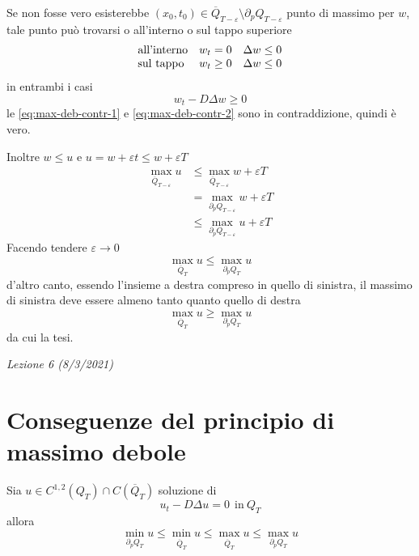 \documentclass[10pt,a4paper,twoside,openright]{book}
\begin{document}
\begin{dimostrazione}
Se non fosse vero esisterebbe $(x_{0},t_{0}) \in \overline{Q}_{T-\varepsilon } \setminus \partial _{p} Q_{T-\varepsilon }$ punto di massimo per $w$, tale punto può trovarsi o all'interno o sul tappo superiore
\begin{equation*}
\begin{array}{ l l l }
\text{all'interno} & w_{t} =0 & \Delta w\leqslant 0\\
\text{sul tappo} & w_{t} \geqslant 0 & \Delta w\leqslant 0
\end{array}
\end{equation*}
in entrambi i casi
\begin{equation}
w_{t} -D\Delta w\geqslant 0
\label{eq:max-deb-contr-2}
\end{equation}
le \eqref{eq:max-deb-contr-1} e \eqref{eq:max-deb-contr-2} sono in contraddizione, quindi è vero.

Inoltre $w\leqslant u$ e $u=w+\varepsilon t\leqslant w+\varepsilon T$
\begin{align*}
\max_{\overline{Q}_{T-\varepsilon }} u & \leqslant \max_{\overline{Q}_{T-\varepsilon }} w+\varepsilon T\\
 & =\max_{\partial _{p} Q_{T-\varepsilon }} w+\varepsilon T\\
 & \leqslant \max_{\partial _{p} Q_{T-\varepsilon }} u+\varepsilon T
\end{align*}
Facendo tendere $\varepsilon \rightarrow 0$
\begin{equation*}
\max_{\overline{Q}_{T}} u\leqslant \max_{\partial _{p} Q_{T}} u
\end{equation*}
d'altro canto, essendo l'insieme a destra compreso in quello di sinistra, il massimo di sinistra deve essere almeno tanto quanto quello di destra
\begin{equation*}
\max_{\overline{Q}_{T}} u\geqslant \max_{\partial _{p} Q_{T}} u
\end{equation*}
da cui la tesi.
\end{dimostrazione}
\textit{Lezione 6 (8/3/2021)}
\section{Conseguenze del principio di massimo debole}

Sia $u\in C^{1,2}(Q_{T}) \cap C(\overline{Q}_{T})$ soluzione di
\begin{equation*}
u_{t} -D\Delta u=0\ \ \text{in} \ Q_{T}
\end{equation*}
allora
\begin{equation*}
\min_{\partial _{p} Q_{T}} u\leqslant \min_{\overline{Q}_{T}} u\leqslant \max_{\overline{Q}_{T}} u\leqslant \max_{\partial _{p} Q_{T}} u
\end{equation*}
\end{document}
